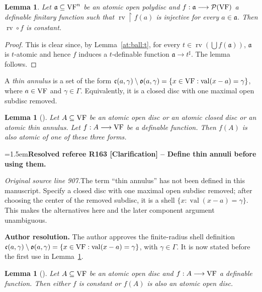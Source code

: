 \documentclass[12pt]{amsart}
\newcommand{\ResolvedRefereeRemark}[5]{%
  \par\medskip\begingroup\normalfont\small\color{gray}%
  \emergencystretch=1.5em\noindent\textbf{Resolved referee R#1 [#2] -- #3.}\par\nobreak\noindent #4\par
  \medskip\color{ResolutionGreen}\noindent\textbf{Author resolution.} #5\par
  \endgroup\medskip
}
\newcommand{\memph}[1]{{\color{magenta}\emph{#1}}}
\theoremstyle{plain}
\newtheorem{lem}[thm]{Lemma}
\theoremstyle{definition}
\theoremstyle{remark}
\numberwithin{equation}{section}
\theoremstyle{plain}
\newcommand{\VF}{\textup{VF}}
\newcommand{\ga}{\mathfrak{a}}
\newcommand{\gb}{\mathfrak{b}}
\newcommand{\gc}{\mathfrak{c}}
\newcommand{\go}{\mathfrak{o}}
\newcommand{\0}{\emptyset}
\newcommand{\mdl}[1]{\mathcal{#1}}  %
\newcommand{\rest}{\upharpoonright}
\newcommand{\fun}{\longrightarrow}
\newcommand{\sub}{\subseteq}
\DeclareMathOperator{\rv}{rv}
\DeclareMathOperator{\vv}{val}
\begin{document}

\begin{lem}\label{at:rv:split}
Let $\ga \sub \VF^n$ be an atomic open polydisc and $f : \ga \fun \mdl P(\VF)$ a definable finitary function such that $\rv \rest f(a)$ is injective for every $a \in \ga$.  Then  $\rv \circ f$ is constant.
\end{lem}
\begin{proof}
This is clear since, by Lemma~\ref{at:ball:t}, for every $t \in \rv(\bigcup f(\ga))$, $\ga$ is $t$-atomic and hence $f$ induces a $t$-definable function $\ga \fun t^\sharp$. The lemma follows.
\end{proof}

A \memph{thin annulus} is a set of the form $\gc(a,\gamma)\setminus\go(a,\gamma)=\{x\in\VF:\vv(x-a)=\gamma\}$, where $a\in\VF$ and $\gamma\in\Gamma$. Equivalently, it is a closed disc with one maximal open subdisc removed.

\begin{lem}[{\cite[Lemma~3.8]{Yin:int:acvf}}]\label{hae:component:11}
Let $A \sub \VF$ be an atomic open disc or an atomic closed disc or an atomic thin annulus. Let $f : A \fun \VF$ be a definable function. Then $f(A)$ is also atomic of one of these three forms.
\end{lem}

\ResolvedRefereeRemark{163}{Clarification}{Define thin annuli before using them}{%
\textit{Original source line 907.}\quad The term ``thin annulus'' has not been defined in this manuscript. Specify a closed disc with one maximal open subdisc removed; after choosing the center of the removed subdisc, it is a shell $\{x:\vv(x-a)=\gamma\}$. This makes the alternatives here and the later component argument unambiguous.
}{The author approves the finite-radius shell definition $\gc(a,\gamma)\setminus\go(a,\gamma)=\{x\in\VF:\vv(x-a)=\gamma\}$, with $\gamma\in\Gamma$. It is now stated before the first use in Lemma~\ref{hae:component:11}.}

\begin{lem}[{\cite[Lemma~3.13]{Yin:int:acvf}}]\label{atomic:open:ball:open}
Let $A \sub \VF$ be an atomic open disc and $f : A \fun \VF$ a definable function. Then either $f$ is constant or $f(A)$ is also an atomic open disc.
\end{lem}
\end{document}
